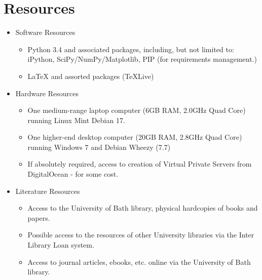 \documentclass{article}
\begin{document}


\section{Resources}
\label{sec:resources}
\begin{itemize}
	\item Software Resources
	\begin{itemize}
		\item Python 3.4 and associated packages, including, but not limited to: iPython, SciPy/NumPy/Matplotlib, PIP (for requirements management.)
		\item LaTeX and assorted packages (TeXLive)
	\end{itemize}
	\item Hardware Resources
	\begin{itemize}
		\item One medium-range laptop computer (6GB RAM, 2.0GHz Quad Core) running Linux Mint Debian 17.
		\item One higher-end desktop computer (20GB RAM, 2.8GHz Quad Core) running Windows 7 and Debian Wheezy (7.7)
		\item If absolutely required, access to creation of Virtual Private Servers from DigitalOcean - for some cost.
	\end{itemize}
	\item Literature Resources
	\begin{itemize}
		\item Access to the University of Bath library, physical hardcopies of books and papers.
		\item Possible access to the resources of other University libraries via the Inter Library Loan system.
		\item Access to journal articles, ebooks, etc. online via the University of Bath library.
	\end{itemize}
\end{itemize}

\printbibliography
\end{document}
